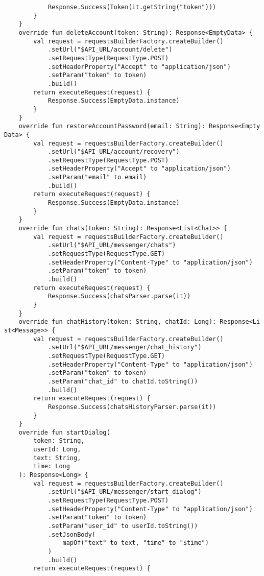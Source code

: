 \documentclass[listing]{espd}
\begin{document}
\begin{verbatim}
            Response.Success(Token(it.getString("token")))
        }
    }
    override fun deleteAccount(token: String): Response<EmptyData> {
        val request = requestsBuilderFactory.createBuilder()
            .setUrl("$API_URL/account/delete")
            .setRequestType(RequestType.POST)
            .setHeaderProperty("Accept" to "application/json")
            .setParam("token" to token)
            .build()
        return executeRequest(request) {
            Response.Success(EmptyData.instance)
        }
    }
    override fun restoreAccountPassword(email: String): Response<Empty
Data> {
        val request = requestsBuilderFactory.createBuilder()
            .setUrl("$API_URL/account/recovery")
            .setRequestType(RequestType.POST)
            .setHeaderProperty("Accept" to "application/json")
            .setParam("email" to email)
            .build()
        return executeRequest(request) {
            Response.Success(EmptyData.instance)
        }
    }
    override fun chats(token: String): Response<List<Chat>> {
        val request = requestsBuilderFactory.createBuilder()
            .setUrl("$API_URL/messenger/chats")
            .setRequestType(RequestType.GET)
            .setHeaderProperty("Content-Type" to "application/json")
            .setParam("token" to token)
            .build()
        return executeRequest(request) {
            Response.Success(chatsParser.parse(it))
        }
    }
    override fun chatHistory(token: String, chatId: Long): Response<Li
st<Message>> {
        val request = requestsBuilderFactory.createBuilder()
            .setUrl("$API_URL/messenger/chat_history")
            .setRequestType(RequestType.GET)
            .setHeaderProperty("Content-Type" to "application/json")
            .setParam("token" to token)
            .setParam("chat_id" to chatId.toString())
            .build()
        return executeRequest(request) {
            Response.Success(chatsHistoryParser.parse(it))
        }
    }
    override fun startDialog(
        token: String,
        userId: Long,
        text: String,
        time: Long
    ): Response<Long> {
        val request = requestsBuilderFactory.createBuilder()
            .setUrl("$API_URL/messenger/start_dialog")
            .setRequestType(RequestType.POST)
            .setHeaderProperty("Content-Type" to "application/json")
            .setParam("token" to token)
            .setParam("user_id" to userId.toString())
            .setJsonBody(
                mapOf("text" to text, "time" to "$time")
            )
            .build()
        return executeRequest(request) {

\end{verbatim}
\end{document}
